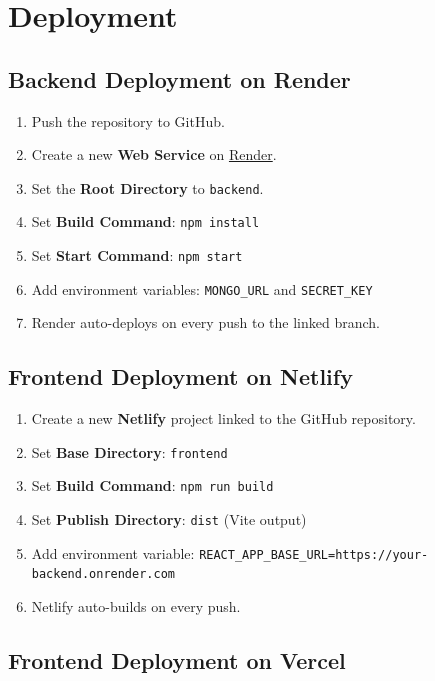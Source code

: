 \documentclass[12pt,a4paper]{report}
\begin{document}
\chapter{Deployment}

\section{Backend Deployment on Render}

\begin{enumerate}[leftmargin=2em]
  \item Push the repository to GitHub.
  \item Create a new \textbf{Web Service} on \href{https://render.com}{Render}.
  \item Set the \textbf{Root Directory} to \texttt{backend}.
  \item Set \textbf{Build Command}: \texttt{npm install}
  \item Set \textbf{Start Command}: \texttt{npm start}
  \item Add environment variables: \texttt{MONGO\_URL} and \texttt{SECRET\_KEY}
  \item Render auto-deploys on every push to the linked branch.
\end{enumerate}

\section{Frontend Deployment on Netlify}

\begin{enumerate}[leftmargin=2em]
  \item Create a new \textbf{Netlify} project linked to the GitHub repository.
  \item Set \textbf{Base Directory}: \texttt{frontend}
  \item Set \textbf{Build Command}: \texttt{npm run build}
  \item Set \textbf{Publish Directory}: \texttt{dist} (Vite output)
  \item Add environment variable: \texttt{REACT\_APP\_BASE\_URL=https://your-backend.onrender.com}
  \item Netlify auto-builds on every push.
\end{enumerate}

\section{Frontend Deployment on Vercel}
\end{document}
